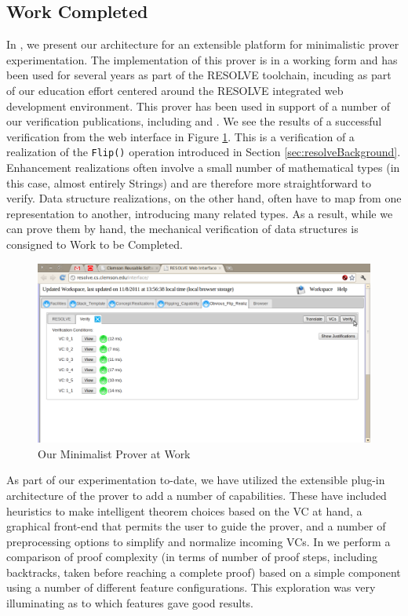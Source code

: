 \subsection{Work Completed}
In \cite{smith10}, we present our architecture for an extensible platform for minimalistic prover experimentation.  The implementation of this prover is in a working form and has been used for several years as part of the RESOLVE toolchain, incuding as part of our education effort centered around the RESOLVE integrated web development environment\cite{chuckThesis}.  This prover has been used in support of a number of our verification publications, including \cite{Sit11} and \cite{smithMinimalist}.  We see the results of a successful verification from the web interface in Figure \ref{fig:successfulverification}.  This is a verification of a realization of the \texttt{Flip()} operation introduced in Section \ref{sec:resolveBackground}.  Enhancement realizations often involve a small number of mathematical types (in this case, almost entirely Strings) and are therefore more straightforward to verify.  Data structure realizations, on the other hand, often have to map from one representation to another, introducing many related types.  As a result, while we can prove them by hand, the mechanical verification of data structures is consigned to Work to be Completed.

\begin{figure}
  \centering
    \includegraphics[width=\textwidth]{successfulverification}
  \caption{Our Minimalist Prover at Work\label{fig:successfulverification}}
\end{figure}

As part of our experimentation to-date, we have utilized the extensible plug-in architecture of the prover to add a number of capabilities.  These have included heuristics to make intelligent theorem choices based on the VC at hand, a graphical front-end that permits the user to guide the prover, and a number of preprocessing options to simplify and normalize incoming VCs.  In \cite{smithMinimalist} we perform a comparison of proof complexity (in terms of number of proof steps, including backtracks, taken before reaching a complete proof) based on a simple component using a number of different feature configurations.  This exploration was very illuminating as to which features gave good results.


